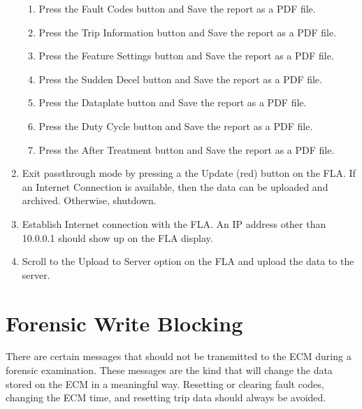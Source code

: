 \documentclass[11pt]{article}
\begin{document}
\begin{enumerate}
\begin{enumerate}
\item Press the Fault Codes button and Save the report as a PDF file.
\item Press the Trip Information button and Save the report as a PDF file.
\item Press the Feature Settings button and Save the report as a PDF file.
\item Press the Sudden Decel button and Save the report as a PDF file.
\item Press the Dataplate button and Save the report as a PDF file.
\item Press the Duty Cycle button and Save the report as a PDF file.
\item Press the After Treatment button and Save the report as a PDF file.
\end{enumerate}
\item Exit passthrough mode by pressing a the Update (red) button on the
FLA. If an Internet Connection is available, then the data can be
uploaded and archived. Otherwise, shutdown.
\item Establish Internet connection with the FLA. An IP address other than
10.0.0.1 should show up on the FLA display. 
\item Scroll to the Upload to Server option on the FLA and upload the data
to the server.
\end{enumerate}

\section{\label{sec:Forensic-Write-Blocking}Forensic Write Blocking}

There are certain messages that should not be transmitted to the ECM
during a forensic examination. These messages are the kind that will
change the data stored on the ECM in a meaningful way. Resetting or
clearing fault codes, changing the ECM time, and resetting trip data
should always be avoided. 
\end{document}
